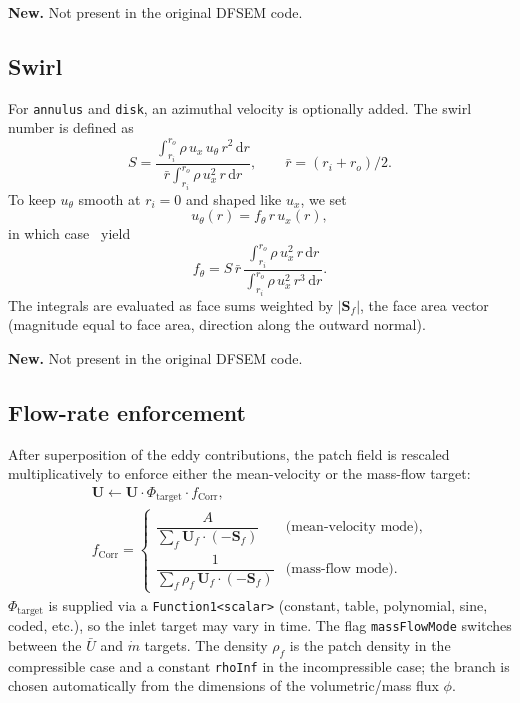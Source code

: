 \documentclass[
 amsmath,amssymb,
 aps,
 twocolumn,
]{revtex4-2}
\renewcommand{\vec}[1]{\boldsymbol{#1}}
\newcommand{\dd}{\mathrm{d}}
\newcommand{\improv}[1]{\par\medskip\noindent\textbf{#1}\hspace{0.5em}\ignorespaces}
\begin{document}
\improv{New.}
Not present in the original DFSEM code.

\subsection{Swirl}\label{sec:swirl}

For \texttt{annulus} and \texttt{disk}, an azimuthal velocity is
optionally added. The swirl number is defined as
\begin{equation}\label{eq:SwirlNr}
  S = \frac{\int_{r_i}^{r_o}\rho\,u_x\,u_\theta\,r^2\,\dd r}
           {\bar r\int_{r_i}^{r_o}\rho\,u_x^2\,r\,\dd r},
  \qquad \bar r=(r_i+r_o)/2.
\end{equation}
To keep $u_\theta$ smooth at $r_i=0$ and shaped like $u_x$, we set
\begin{equation}\label{eq:utheta}
  u_\theta(r) = f_\theta\,r\,u_x(r),
\end{equation}
in which case~ yield
\begin{equation}\label{eq:ftheta}
  f_\theta
  = S\,\bar r\,
    \frac{\displaystyle\int_{r_i}^{r_o}\rho\,u_x^2\,r\,\dd r}
         {\displaystyle\int_{r_i}^{r_o}\rho\,u_x^2\,r^3\,\dd r}.
\end{equation}
The integrals are evaluated as face sums weighted by $|\vec S_f|$,
the face area vector (magnitude equal to face area, direction along the
outward normal).

\improv{New.}
Not present in the original DFSEM code.

\subsection{Flow-rate enforcement}\label{sec:rescale}

After superposition of the eddy contributions, the patch field is
rescaled multiplicatively to enforce either the mean-velocity or the
mass-flow target:
\begin{equation}\label{eq:fCorr}
\begin{gathered}
  \vec U \leftarrow \vec U \cdot \Phi_{\mathrm{target}}\cdot f_{\mathrm{Corr}}, \\[0.4em]
  f_{\mathrm{Corr}} =
  \begin{cases}
    \dfrac{A}{\displaystyle\sum_f \vec U_f\cdot(-\vec S_f)}
       & \text{(mean-velocity mode)},\\[1.4em]
    \dfrac{1}{\displaystyle\sum_f \rho_f\,\vec U_f\cdot(-\vec S_f)}
       & \text{(mass-flow mode)}.
  \end{cases}
\end{gathered}
\end{equation}
$\Phi_{\mathrm{target}}$ is supplied via a \texttt{Function1<scalar>}
(constant, table, polynomial, sine, coded, etc.), so the inlet target
may vary in time. The flag \texttt{massFlowMode} switches between the
$\bar U$ and $\dot m$ targets. The density $\rho_f$ is the patch density
in the compressible case and a constant \texttt{rhoInf} in the
incompressible case; the branch is chosen automatically from the
dimensions of the volumetric/mass flux $\phi$.
\end{document}
